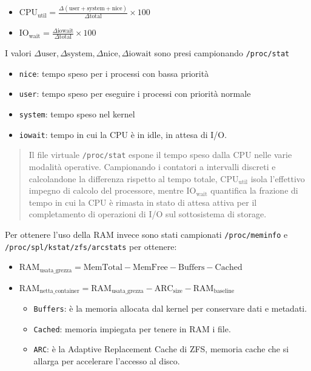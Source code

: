 \begin{itemize}
\tightlist
\item
  \(\text{CPU}_{\text{util}} = \frac{\Delta (\text{user} + \text{system} + \text{nice})}{\Delta \text{total}} \times 100\)
\item
  \(\text{IO}_{\text{wait}} = \frac{\Delta \text{iowait}}{\Delta \text{total}} \times 100\)
\end{itemize}

I valori
\(\Delta \text{user}, \Delta \text{system}, \Delta \text{nice}, \Delta \text{iowait}\)
sono presi campionando \passthrough{\lstinline!/proc/stat!}

\begin{itemize}
\tightlist
\item
  \passthrough{\lstinline!nice!}: tempo speso per i processi con bassa
  priorità
\item
  \passthrough{\lstinline!user!}: tempo speso per eseguire i processi
  con priorità normale
\item
  \passthrough{\lstinline!system!}: tempo speso nel kernel
\item
  \passthrough{\lstinline!iowait!}: tempo in cui la CPU è in idle, in
  attesa di I/O.
\end{itemize}

\begin{quote}
Il file virtuale \passthrough{\lstinline!/proc/stat!} espone il tempo
speso dalla CPU nelle varie modalità operative. Campionando i contatori
a intervalli discreti e calcolandone la differenza rispetto al tempo
totale, \(\text{CPU}_{\text{util}}\) isola l'effettivo impegno di
calcolo del processore, mentre \(\text{IO}_{\text{wait}}\) quantifica la
frazione di tempo in cui la CPU è rimasta in stato di attesa attiva per
il completamento di operazioni di I/O sul sottosistema di storage.
\end{quote}

Per ottenere l'uso della RAM invece sono stati campionati
\passthrough{\lstinline!/proc/meminfo!} e
\passthrough{\lstinline!/proc/spl/kstat/zfs/arcstats!} per ottenere:

\begin{itemize}
\tightlist
\item
  \(\text{RAM}_{\text{usata\_grezza}} = \text{MemTotal} - \text{MemFree} - \text{Buffers} - \text{Cached}\)
\item
  \(\text{RAM}_{\text{netta\_container}} = \text{RAM}_{\text{usata\_grezza}} - \text{ARC}_{\text{size}} - \text{RAM}_{\text{baseline}}\)

  \begin{itemize}
  \tightlist
  \item
    \passthrough{\lstinline!Buffers!}: è la memoria allocata dal kernel
    per conservare dati e metadati.
  \item
    \passthrough{\lstinline!Cached!}: memoria impiegata per tenere in
    RAM i file.
  \item
    \passthrough{\lstinline!ARC!}: è la Adaptive Replacement Cache di
    ZFS, memoria cache che si allarga per accelerare l'accesso al disco.
  \end{itemize}
\end{itemize}

